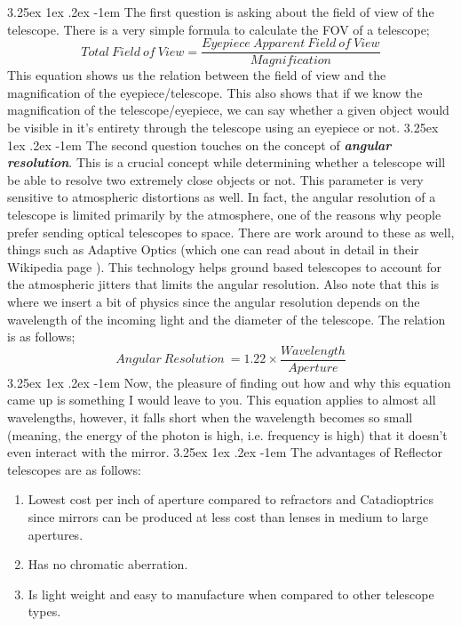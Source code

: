 \documentclass[a4paper,twoside,11pt]{article}
\makeatletter
\numberwithin{equation}{section}
\renewcommand\paragraph{\@startsection{paragraph}{5}{\z@}%
  {3.25ex \@plus1ex \@minus.2ex}%
  {-1em}%
  {\normalfont\normalsize\bfseries}}
\makeatother
\begin{document}
\paragraph{}
The first question is asking about the field of view of the telescope. There is a very simple formula to calculate the FOV of a telescope;
\begin{equation}
Total \ Field \ of \ View = \frac{Eyepiece \ Apparent \ Field \ of \ View}{Magnification}
\end{equation}
This equation shows us the relation between the field of view and the magnification of the eyepiece/telescope. This also shows that if we know the magnification of the telescope/eyepiece, we can say whether a given object would be visible in it's entirety through the telescope using an eyepiece or not.
\paragraph{}
The second question touches on the concept of \textit{\textbf{angular resolution}}. This is a crucial concept while determining whether a telescope will be able to resolve two extremely close objects or not. This parameter is very sensitive to atmospheric distortions as well. In fact, the angular resolution of a telescope is limited primarily by the atmosphere, one of the reasons why people prefer sending optical telescopes to space. There are work around to these as well, things such as Adaptive Optics (which one can read about in detail in their Wikipedia page \cite{AO1}). This technology helps ground based telescopes to account for the atmospheric jitters that limits the angular resolution. Also note that this is where we insert a bit of physics since the angular resolution depends on the wavelength of the incoming light and the diameter of the telescope. The relation is as follows;
\begin{equation}
Angular \ Resolution \ = 1.22 \times \frac{Wavelength}{Aperture}
\end{equation}
\paragraph{}
Now, the pleasure of finding out how and why this equation came up is something I would leave to you. This equation applies to almost all wavelengths, however, it falls short when the wavelength becomes so small (meaning, the energy of the photon is high, i.e. frequency is high) that it doesn't even interact with the mirror. 
\paragraph{}
The advantages of Reflector telescopes are as follows:
\begin{enumerate}
    \item Lowest cost per inch of aperture compared to refractors and Catadioptrics since mirrors can be produced at less cost than lenses in medium to large apertures.
    \item Has no chromatic aberration. 
    \item Is light weight and easy to manufacture when compared to other telescope types.
\end{enumerate}
\end{document}
